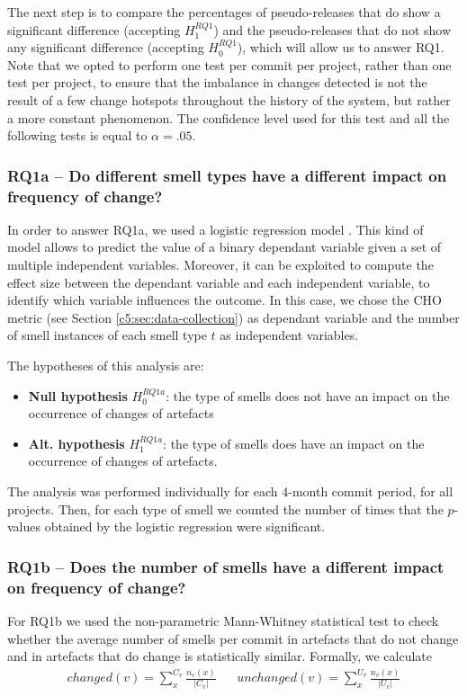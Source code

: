 The next step is to compare the percentages of pseudo-releases that do show a significant difference (accepting $H^{RQ1}_1$) and the pseudo-releases that do not show any significant difference (accepting $H^{RQ1}_0$), which will allow us to answer RQ1.
Note that we opted to perform one test per commit per project, rather than one test per project, to ensure that the imbalance in changes detected is not the result of a few change hotspots throughout the history of the system, but rather a more constant phenomenon.
The confidence level used for this test and all the following tests is equal to $\alpha = .05$.

\subsubsection{RQ1a -- Do different smell types have a different impact on frequency of change?}\label{c5:sec:rq1a-analysis}
In order to answer RQ1a, we used a logistic regression model \cite{Sheskin2007}. This kind of model allows to predict the value of a binary dependant variable given a set of multiple independent variables. 
Moreover, it can be exploited to compute the effect size between the dependant variable and each independent variable, to identify which variable influences the outcome.
In this case, we chose the CHO metric (see Section \ref{c5:sec:data-collection}) as dependant variable and the number of smell instances of each smell type $t$ as independent variables.

The hypotheses of this analysis are:
\begin{itemize}
    \item \textbf{Null hypothesis} $H^{RQ1a}_0$: the type of smells does not have an impact on the occurrence of changes of artefacts
    \item \textbf{Alt. hypothesis} $H^{RQ1a}_1$: the type of smells does have an impact on the occurrence of changes of artefacts.
\end{itemize}
The analysis was performed individually for each 4-month commit period, for all projects. Then, for each type of smell we counted the number of times that the $p$-values obtained by the logistic regression were significant.

\subsubsection{RQ1b -- Does the number of smells have a different impact on frequency of change?}
For RQ1b we used the non-parametric Mann-Whitney statistical test to check whether the average number of smells per commit in artefacts that do not change and in artefacts that do change is statistically similar.
Formally, we calculate
\begin{align*}
    changed(v) = \sum_x^{C_v}\frac{n_v(x)}{|C_v|} & & unchanged(v) = \sum_x^{U_v}\frac{n_v(x)}{|U_v|}
\end{align*}


